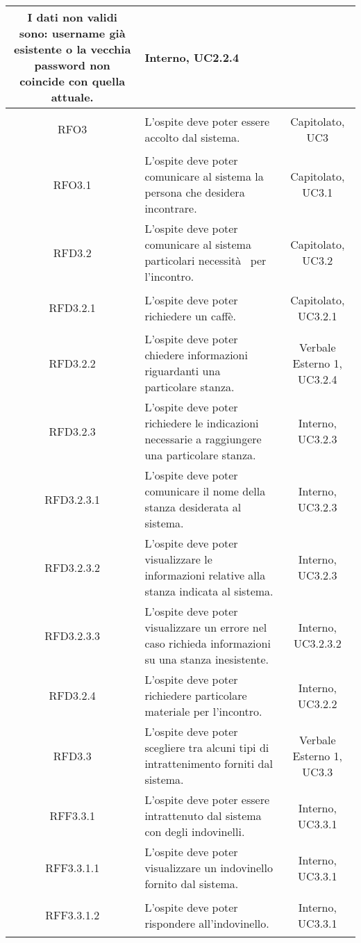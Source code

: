 \begin{longtable}{|c|>{\centering}m{7cm}|c|}
	I dati non validi sono: username già esistente o la vecchia password non coincide con quella attuale. & Interno, UC2.2.4\\ \hline
	\hypertarget{RFO3}{RFO3} & L'ospite deve poter essere accolto dal sistema. & Capitolato, UC3\\ \hline
	\hypertarget{RFO3.1}{RFO3.1} & L'ospite deve poter comunicare al sistema la persona che desidera incontrare. & Capitolato, UC3.1\\ \hline
	\hypertarget{RFD3.2}{RFD3.2} & L'ospite deve poter comunicare al sistema particolari necessità  per l'incontro. & Capitolato, UC3.2\\ \hline
	\hypertarget{RFD3.2.1}{RFD3.2.1} & L'ospite deve poter richiedere un caffè. & Capitolato, UC3.2.1\\ \hline
	\hypertarget{RFD3.2.2}{RFD3.2.2} & L'ospite deve poter chiedere informazioni riguardanti una particolare stanza. & Verbale Esterno 1, UC3.2.4\\ \hline
	\hypertarget{RFD3.2.3}{RFD3.2.3} & L'ospite deve poter richiedere le indicazioni necessarie a raggiungere una particolare stanza. & Interno, UC3.2.3\\ \hline
	\hypertarget{RFD3.2.3.1}{RFD3.2.3.1} & L'ospite deve poter comunicare il nome della stanza desiderata al sistema. & Interno, UC3.2.3\\ \hline
	\hypertarget{RFD3.2.3.2}{RFD3.2.3.2} & L'ospite deve poter visualizzare le informazioni relative alla stanza indicata al sistema. & Interno, UC3.2.3\\ \hline
	\hypertarget{RFD3.2.3.3}{RFD3.2.3.3} & L'ospite deve poter visualizzare un errore nel caso richieda informazioni su una stanza inesistente. & Interno, UC3.2.3.2\\ \hline
	\hypertarget{RFD3.2.4}{RFD3.2.4} & L'ospite deve poter richiedere particolare materiale per l'incontro. & Interno, UC3.2.2\\ \hline
	\hypertarget{RFD3.3}{RFD3.3} & L'ospite deve poter scegliere tra alcuni tipi di intrattenimento forniti dal sistema. & Verbale Esterno 1, UC3.3\\ \hline
	\hypertarget{RFF3.3.1}{RFF3.3.1} & L'ospite deve poter essere intrattenuto dal sistema con degli indovinelli. & Interno, UC3.3.1\\ \hline
	\hypertarget{RFF3.3.1.1}{RFF3.3.1.1} & L'ospite deve poter visualizzare un indovinello fornito dal sistema. & Interno, UC3.3.1\\ \hline
	\hypertarget{RFF3.3.1.2}{RFF3.3.1.2} & L'ospite deve poter rispondere all'indovinello. & Interno, UC3.3.1\\ \hline

\end{longtable}
